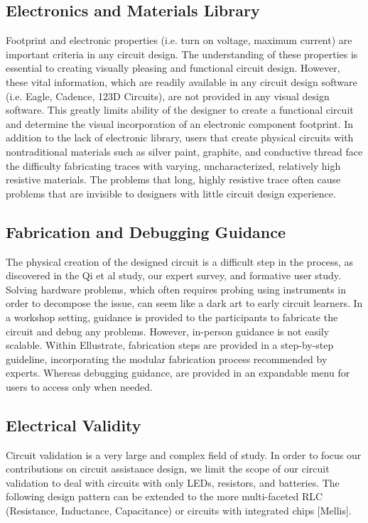 \documentclass{sigchi}
\begin{document}
\subsection{Electronics and Materials Library}
Footprint and electronic properties (i.e. turn on voltage, maximum current) are important criteria in any circuit design. The understanding of these properties is essential to creating visually pleasing and functional circuit design. However, these vital information, which are readily available in any circuit design software (i.e. Eagle, Cadence, 123D Circuits), are not provided in any visual design software. This greatly limits ability of the designer to create a functional circuit and determine the visual incorporation of an electronic component footprint. In addition to the lack of electronic library, users that create physical circuits with nontraditional materials such as silver paint, graphite, and conductive thread face the difficulty fabricating traces with varying, uncharacterized, relatively high resistive materials. The problems that long, highly resistive trace often cause problems that are invisible to designers with little circuit design experience. 

\subsection{Fabrication and Debugging Guidance}
  The physical creation of the designed circuit is a difficult step in the process, as discovered in the Qi et al study, our expert survey, and formative user study. Solving hardware problems, which often requires probing using instruments in order to decompose the issue, can seem like a dark art to early circuit learners. In a workshop setting, guidance is provided to the participants to fabricate the circuit and debug any problems. However, in-person guidance is not easily scalable. Within Ellustrate, fabrication steps are provided in a step-by-step guideline, incorporating the modular fabrication process recommended by experts. Whereas debugging guidance, are provided in an expandable menu for users to access only when needed. 


 
\subsection{Electrical Validity}
  Circuit validation is a very large and complex field of study. In order to focus our contributions on circuit assistance design, we limit the scope of our circuit validation to deal with circuits with only LEDs, resistors, and batteries. The following design pattern can be extended to the more multi-faceted RLC (Resistance, Inductance, Capacitance) or circuits with integrated chips [Mellis].
\end{document}

